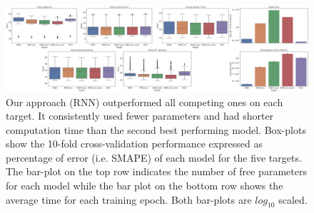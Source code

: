 \lorem


\lorem


\begin{figure}[h]
\centering
\includegraphics[width=.8\textwidth]{images/chapter_3/performance_exploded_33.png}
\caption[\textbf{Dis-aggregated comparison of models' performance}]{Our approach (RNN) outperformed all competing ones on each target. It consistently used fewer parameters and had shorter computation time than the second best performing model. Box-plots show the 10-fold cross-validation performance expressed as percentage of error (i.e. SMAPE) of each model for the five targets. The bar-plot on the top row indicates the number of free parameters for each model while the bar plot on the bottom row shows the average time for each training epoch. Both bar-plots are $log_{10}$ scaled.}
\label{model_comp_expl_33} 
\end{figure}

